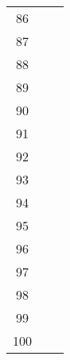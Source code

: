 \begin{longtable}{|c|p{}|p{}|}
86 & & \\
87 & & \\
88 & & \\
89 & & \\
90 & & \\
91 & & \\
92 & & \\
93 & & \\
94 & & \\
95 & & \\
96 & & \\
97 & & \\
98 & & \\
99 & & \\
100 & & \\


\hline
\end{longtable}
